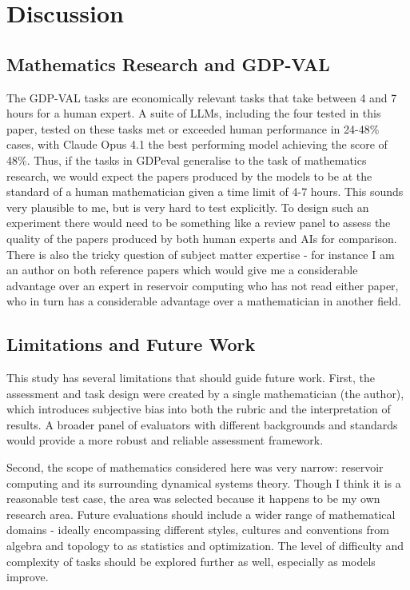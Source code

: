 \documentclass[11pt]{article}
\begin{document}
\section{Discussion}

\subsection{Mathematics Research and GDP-VAL}

The GDP-VAL tasks are economically relevant tasks that take between 4 and 7 hours for a human expert. A suite of LLMs, including the four tested in this paper, tested on these tasks met or exceeded human performance in 24-48\% cases, with Claude Opus 4.1 the best performing model achieving the score of 48\%. Thus, if the tasks in GDPeval generalise to the task of mathematics research, we would expect the papers produced by the models to be at the standard of a human mathematician given a time limit of 4-7 hours. This sounds very plausible to me, but is very hard to test explicitly. To design such an experiment there would need to be something like a review panel to assess the quality of the papers produced by both human experts and AIs for comparison. There is also the tricky question of subject matter expertise - for instance I am an author on both reference papers which would give me a considerable advantage over an expert in reservoir computing who has not read either paper, who in turn has a considerable advantage over a mathematician in another field.

\subsection{Limitations and Future Work}

This study has several limitations that should guide future work. First, the assessment and task design were created by a single mathematician (the author), which introduces subjective bias into both the rubric and the interpretation of results. A broader panel of evaluators with different backgrounds and standards would provide a more robust and reliable assessment framework. 

Second, the scope of mathematics considered here was very narrow: reservoir computing and its surrounding dynamical systems theory. Though I think it is a reasonable test case, the area was selected because it happens to be my own research area. Future evaluations should include a wider range of mathematical domains - ideally encompassing different styles, cultures and conventions from algebra and topology to as statistics and optimization. The level of difficulty and complexity of tasks should be explored further as well, especially as models improve.
\end{document}
